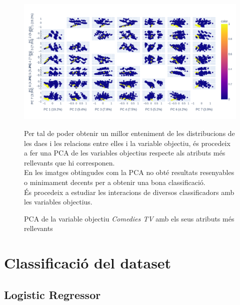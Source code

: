 \documentclass[a4paper, 11pt]{article}
\begin{document}
\begin{figure}[h] %
\begin{minipage}{7.5cm} %
\begin{center}
    \includegraphics[width = 1 \textwidth]{PCA.png}
    \caption{PCA de la variable objectiu \textit{Comedies TV} amb els seus atributs més rellevants}
    \label{fig:my_label}
\end{center}
\end{minipage} %
\hspace{2em}
\begin{minipage}{6cm} %
Per tal de poder obtenir un millor enteniment de les distribucions de les daes i les relacions entre elles i la variable objectiu, és procedeix a fer una PCA de les variables objectius respecte als atributs més rellevants que hi corresponen.\\
En les imatges obtingudes com la PCA no obté resultats resenyables o minimament decents per a obtenir una bona classificació.\\
És procedeix a estudiar les interacions de diversos classificadors amb les variables objectius.
\end{minipage} %
\end{figure}





\newpage
\section{Classificació del dataset}\label{classificacio}
\subsection{Logistic Regressor} \label{logistic}
\end{document}
